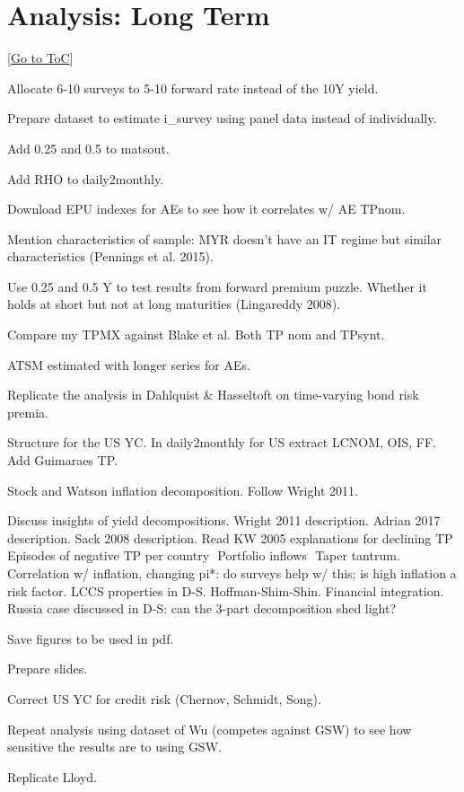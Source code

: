 \documentclass[12pt]{article}
\newcommand{\gototoc}{\vspace{-1.8cm} \null\hfill [\hyperlink{toc}{Go to ToC}] \newline}
\begin{document}
\section{Analysis: Long Term}
\gototoc
\begin{todolist}
	\item Allocate 6-10 surveys to 5-10 forward rate instead of the 10Y yield.
	\item Prepare dataset to estimate i_survey using panel data instead of individually.
	\item Add 0.25 and 0.5 to matsout.
	\item Add RHO to daily2monthly. 
	\item Download EPU indexes for AEs to see how it correlates w/ AE TPnom.
	\item Mention characteristics of sample: MYR doesn't have an IT regime but similar characteristics (Pennings et al. 2015).
	\item Use 0.25 and 0.5 Y to test results from forward premium puzzle. Whether it holds at short but not at long maturities (Lingareddy 2008).
	\item Compare my TPMX against Blake et al. Both TP nom and TPsynt.
	\item ATSM estimated with longer series for AEs.
	\item Replicate the analysis in Dahlquist \& Hasseltoft on time-varying bond risk premia.
	\item Structure for the US YC. In daily2monthly for US extract LCNOM, OIS, FF. Add Guimaraes TP.
	\item Stock and Watson inflation decomposition. Follow Wright 2011.
	\item Discuss insights of yield decompositions. Wright 2011 description. Adrian 2017 description. Sack 2008 description. Read KW 2005 explanations for declining TP \(<->\) Episodes of negative TP per country \(<->\) Portfolio inflows \(<->\) Taper tantrum. Correlation w/ inflation, changing pi*: do surveys help w/ this; is high inflation a risk factor. LCCS properties in D-S. Hoffman-Shim-Shin. Financial integration. Russia case discussed in D-S: can the 3-part decomposition shed light?
	\item Save figures to be used in pdf.
	\item Prepare slides.
	\item Correct US YC for credit risk (Chernov, Schmidt, Song).
	\item Repeat analysis using dataset of Wu (competes against GSW) to see how sensitive the results are to using GSW.
	\item Replicate Lloyd.
\end{todolist}
\end{document}
